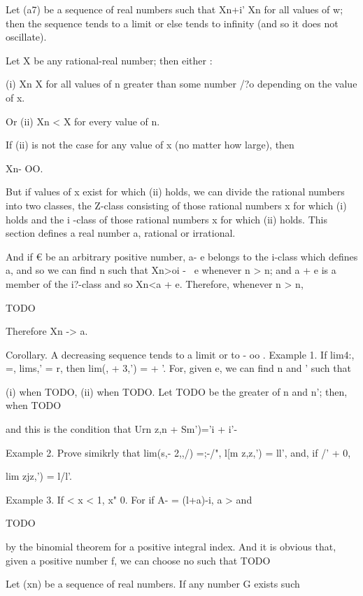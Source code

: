 %
%


Let (a7) be a sequence of real numbers such that Xn+i' Xn for all
values of w; then the sequence tends to a limit or else tends to
infinity (and so it does not oscillate).

Let X be any rational-real number; then either :

(i) Xn X for all values of n greater than some number /?o depending on
the value of x.

Or (ii) Xn < X for every value of n.

If (ii) is not the case for any value of x (no matter how large), then

Xn- OO.

But if values of x exist for which (ii) holds, we can divide the
rational numbers into two classes, the Z-class consisting of those
rational numbers x for which (i) holds and the i -class of those
rational numbers x for which (ii) holds. This section defines a real
number a, rational or irrational.

And if € be an arbitrary positive number, a- e belongs to the i-class
which defines a, and so we can find n such that Xn>oi - \ e whenever n
> n; and a + e is a member of the i?-class and so Xn<a + e.
Therefore, whenever n > n,

TODO

Therefore Xn -> a.

Corollary. A decreasing sequence tends to a limit or to - oo . Example
1. If lim4:, =, lims,' = r, then lim(, + 3,') = + '. For, given
e, we can find n and ' such that

(i) when TODO, (ii) when TODO. Let TODO be the greater of n and n';
then, when TODO

and this is the condition that Urn z,n + Sm')='i + i'-

Example 2. Prove simikrly that lim(s,- 2,,/) =;-/", l[m z,z,') =
ll', and, if /' + 0,

lim zjz,') = l/l'.

Example 3. If < x < 1, x" 0. For if A- = (l+a)-i, a > and

TODO

by the binomial theorem for a positive integral index. And it is
obvious that, given a positive number f, we can choose no such that
TODO


Let (xn) be a sequence of real numbers. If any number G exists such

